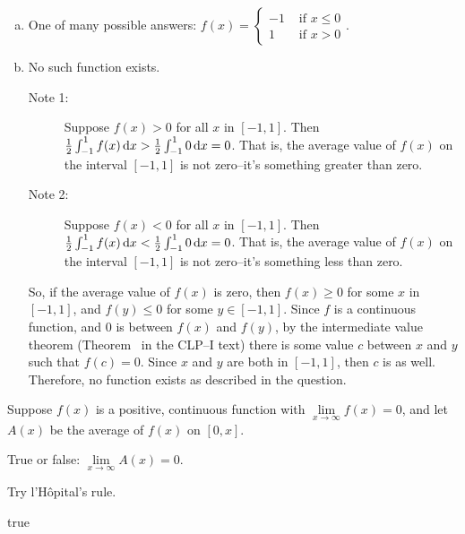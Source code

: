\begin{solution}
\begin{enumerate}[(a)]
\item One of many possible answers: $f(x) = \begin{cases}
-1&\text{ if } x \leq 0\\
1&\text{ if } x > 0
\end{cases}$.
\item No such function exists.
\begin{description}
\item[Note 1:] Suppose $f(x)>0$ for all $x$ in $[-1,1]$. Then $\frac{1}{2}\int_{-1}^1f(x)\,\mathrm{d}x > \frac{1}{2}\int_{-1}^10\,\mathrm{d}x =0 $. That is, the average value of $f(x)$ on the interval $[-1,1]$ is not zero--it's something greater than zero.
\item[Note 2:] Suppose $f(x)<0$ for all $x$ in $[-1,1]$. Then $\frac{1}{2}\int_{-1}^1f(x)\,\mathrm{d}x < \frac{1}{2}\int_{-1}^10\,\mathrm{d}x =0 $. That is, the average value of $f(x)$ on the interval $[-1,1]$ is not zero--it's something less than zero.
\end{description}
So, if the average value of $f(x)$ is zero, then $f(x)\ge 0$ for some $x$ in $[-1,1]$, and $f(y) \le 0$ for some $y \in [-1,1]$. Since $f$ is a continuous function, and 0 is between $f(x)$ and $f(y)$, by the intermediate value theorem (Theorem~ in the CLP--I text) there is some value $c$ between $x$ and $y$ such that $f(c)=0$. Since $x$ and $y$ are both in $[-1,1]$, then $c$ is as well. Therefore, no function exists as described in the question.
\end{enumerate}
\end{solution}
\begin{question}\label{prob_s2.2:limitavg}
Suppose $f(x)$ is a positive, continuous function with $\lim\limits_{x \to \infty} f(x)=0$, and let $A(x)$ be the average of $f(x)$ on $[0,x]$.

True or false: $\lim\limits_{x \to \infty} A(x) = 0$.
\end{question}
\begin{hint}
Try l'H\^{o}pital's rule.
\end{hint}
\begin{answer}
true
\end{answer}
